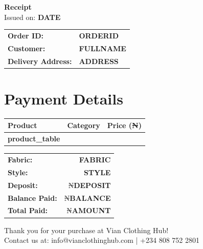 \documentclass[a4paper,12pt]{article}
\begin{document}
\begin{center}
    \color{vianpurple}
    \textbf{\Large Receipt} \\
    \vspace{0.5cm}
    \color{black}
    \small Issued on: \textbf{DATE}
\end{center}

\vspace{1cm}

\begin{tabular}{ll}
    \textbf{Order ID:} & \textbf{ORDERID} \\
    \textbf{Customer:} & \textbf{FULLNAME} \\
    \textbf{Delivery Address:} & \textbf{ADDRESS} \\
\end{tabular}

\vspace{1cm}

\section*{Payment Details}
\begin{tabular}{p{6cm} p{4cm} r}
    \toprule
    \textbf{Product} & \textbf{Category} & \textbf{Price (₦)} \\
    \midrule
    \textbf{product_table}
    \bottomrule
\end{tabular}

\vspace{0.5cm}

\begin{tabular}{lr}
    \textbf{Fabric:} & \textbf{FABRIC} \\
    \textbf{Style:} & \textbf{STYLE} \\
    \textbf{Deposit:} & ₦\textbf{DEPOSIT} \\
    \textbf{Balance Paid:} & ₦\textbf{BALANCE} \\
    \midrule
    \textbf{Total Paid:} & ₦\textbf{AMOUNT} \\
\end{tabular}

\vspace{1cm}

\begin{center}
    \color{vianpurple}
    \small Thank you for your purchase at Vian Clothing Hub! \\
    \small Contact us at: info@vianclothinghub.com | +234 808 752 2801
\end{center}
\end{document}
